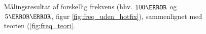 \begin{figure}[h!]
	\vspace*{-0.3 cm}
	\centering
  	\caption{Målingsresultat af forskellig frekvens (hhv. $100\hertz$ og $5\kilo\hertz$, figur \ref{fig:freq_uden_hotfix}), sammenlignet med teorien (\ref{fig:freq_teori}.}
	\label{fig:freq}
\end{figure}

